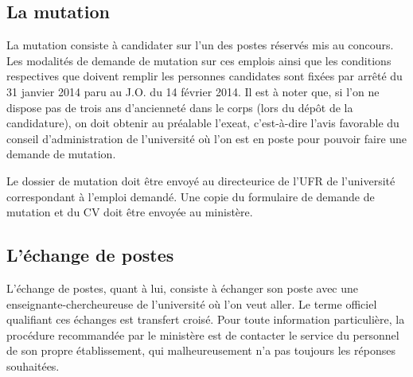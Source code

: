 \subsection*{La mutation}
\label{mutation}


La mutation consiste \`a candidater sur l'un des postes r\'eserv\'es mis au
concours. %
Les modalit\'es de demande de mutation sur ces emplois ainsi que les conditions respectives 
que doivent remplir les personnes candidates sont fix\'ees par  arr\^et\'e du 31 janvier 2014 
paru au J.O. du 14 f\'evrier 2014. Il est \`a noter que, si l'on ne dispose pas de trois ans
d'anciennet\'e dans le corps (lors du d\'ep\^ot de la candidature),
on doit obtenir au pr\'ealable l'exeat, c'est-\`a-dire l'avis
favorable du conseil d'administration de l'universit\'e o\`u l'on
est en poste pour pouvoir faire une demande de mutation.

Le dossier de mutation doit \^etre envoy\'e au directeur\mp ice de l'UFR de l'universit\'e correspondant \`a l'emploi demand\'e. Une copie du formulaire de demande de mutation et du CV doit \^etre envoy\'ee au minist\`ere.

\subsection*{L'\'echange de postes}

L'\'echange de postes, quant \`a lui, consiste \`a \'echanger son
poste avec un\mp e enseignant\mp e-chercheur\mp euse de l'universit\'e o\`u l'on veut
aller. Le terme officiel qualifiant ces \'echanges est
\og transfert crois\'e\fg{}. Pour toute information particuli\`ere, la proc\'edure recommand\'ee
par le minist\`ere est de contacter le service du personnel de son
propre \'etablissement, qui malheureusement n'a pas toujours les r\'eponses
souhait\'ees.

